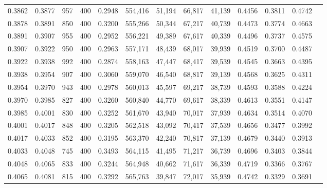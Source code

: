 \begin{tabular}{rrrrrrrrrrrrr}
0.3862 & 0.3877 &    957 &   400 &                                     0.2948 & 554,416 &  51,194 &  66,817 &  41,139 & 0.4456 & 0.3811 & 0.4742 \\
0.3878 & 0.3891 &    850 &   400 &                                     0.3200 & 555,266 &  50,344 &  67,217 &  40,739 & 0.4473 & 0.3774 & 0.4663 \\
0.3891 & 0.3907 &    955 &   400 &                                     0.2952 & 556,221 &  49,389 &  67,617 &  40,339 & 0.4496 & 0.3737 & 0.4575 \\
0.3907 & 0.3922 &    950 &   400 &                                     0.2963 & 557,171 &  48,439 &  68,017 &  39,939 & 0.4519 & 0.3700 & 0.4487 \\
0.3922 & 0.3938 &    992 &   400 &                                     0.2874 & 558,163 &  47,447 &  68,417 &  39,539 & 0.4545 & 0.3663 & 0.4395 \\
0.3938 & 0.3954 &    907 &   400 &                                     0.3060 & 559,070 &  46,540 &  68,817 &  39,139 & 0.4568 & 0.3625 & 0.4311 \\
0.3954 & 0.3970 &    943 &   400 &                                     0.2978 & 560,013 &  45,597 &  69,217 &  38,739 & 0.4593 & 0.3588 & 0.4224 \\
0.3970 & 0.3985 &    827 &   400 &                                     0.3260 & 560,840 &  44,770 &  69,617 &  38,339 & 0.4613 & 0.3551 & 0.4147 \\
0.3985 & 0.4001 &    830 &   400 &                                     0.3252 & 561,670 &  43,940 &  70,017 &  37,939 & 0.4634 & 0.3514 & 0.4070 \\
0.4001 & 0.4017 &    848 &   400 &                                     0.3205 & 562,518 &  43,092 &  70,417 &  37,539 & 0.4656 & 0.3477 & 0.3992 \\
0.4017 & 0.4033 &    852 &   400 &                                     0.3195 & 563,370 &  42,240 &  70,817 &  37,139 & 0.4679 & 0.3440 & 0.3913 \\
0.4033 & 0.4048 &    745 &   400 &                                     0.3493 & 564,115 &  41,495 &  71,217 &  36,739 & 0.4696 & 0.3403 & 0.3844 \\
0.4048 & 0.4065 &    833 &   400 &                                     0.3244 & 564,948 &  40,662 &  71,617 &  36,339 & 0.4719 & 0.3366 & 0.3767 \\
0.4065 & 0.4081 &    815 &   400 &                                     0.3292 & 565,763 &  39,847 &  72,017 &  35,939 & 0.4742 & 0.3329 & 0.3691 \\

\end{tabular}
